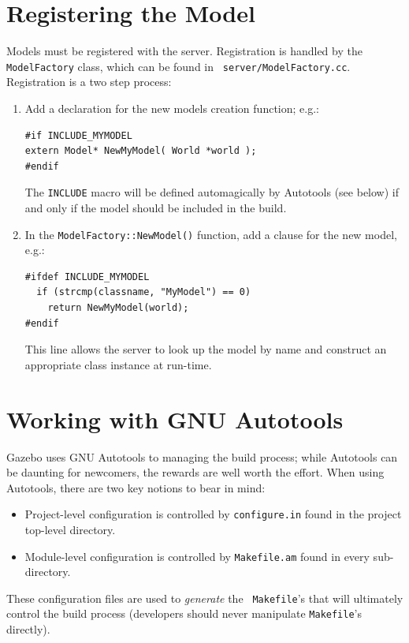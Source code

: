 \documentclass[11pt]{report}
\begin{document}
\section{Registering the Model}

Models must be registered with the server.  Registration is handled by
the {\tt ModelFactory} class, which can be found in {\tt
server/ModelFactory.cc}.  Registration is a two step
process:
\begin{enumerate}
\item Add a declaration for the new models creation function; e.g.:
\begin{verbatim}
#if INCLUDE_MYMODEL
extern Model* NewMyModel( World *world );
#endif \end{verbatim}
The {\tt INCLUDE} macro will be defined automagically by Autotools
(see below) if and only if the model should be included in the build.
\item In the {\tt ModelFactory::NewModel()} function, add a clause
for the new model, e.g.:
\begin{verbatim}
#ifdef INCLUDE_MYMODEL
  if (strcmp(classname, "MyModel") == 0)
    return NewMyModel(world);
#endif \end{verbatim}
This line allows the server to look up the model by name and
construct an appropriate class instance at run-time.
\end{enumerate}


\section{Working with GNU Autotools}

Gazebo uses GNU Autotools to managing the build process; while
Autotools can be daunting for newcomers, the rewards are well worth
the effort.  When using Autotools, there are two key notions to bear
in mind:
\begin{itemize}
\item Project-level configuration is controlled by {\tt configure.in}
found in the project top-level directory.
\item Module-level configuration is controlled by {\tt Makefile.am}
found in every sub-directory.
\end{itemize}
These configuration files are used to {\em generate} the {\tt
Makefile}'s that will ultimately control the build process (developers
should never manipulate {\tt Makefile}'s directly).
\end{document}
